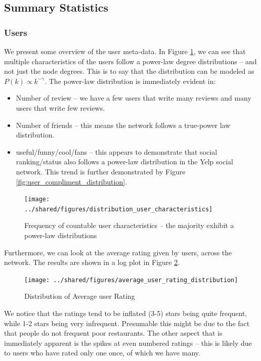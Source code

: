 \documentclass[letterpaper, 10 pt, conference]{ieeeconf}  %
\begin{document}
\subsection{Summary Statistics}
\subsubsection{Users}
We present some overview of the user meta-data. In Figure \ref{fig:user_characteristics}, we can see that multiple characteristics of the users follow a power-law degree distributions -- and not just the node degrees. This is to say that the distribution can be modeled as $P(k) \propto k^{-\gamma}$. The power-law distribution is immediately evident in:

\begin{itemize}
\item Number of review -- we have a few users that write many reviews and many users that write few reviews.
\item Number of friends -- this means the network follows a true-power law distribution.
\item useful/funny/cool/fans -- this appears to demonstrate that social ranking/status also follows a power-law distribution in the Yelp social network. This trend is further demonstrated by Figure \ref{fig:user_compliment_distribution}.
\end{itemize} 

\begin{figure}[h!]
\centering
\texttt{[image: ../shared/figures/distribution\_user\_characteristics]}
\caption{Frequency of countable user characteristics -- the majority exhibit a power-law distributions}
\label{fig:user_characteristics}
\end{figure}

Furthermore, we can look at the average rating given by users, across the network. The results are shown in a log plot in Figure \ref{fig:user_rating_distribution}.

\begin{figure}[h!]
\centering
\texttt{[image: ../shared/figures/average\_user\_rating\_distribution]}
\caption{Distribution of Average user Rating}
\label{fig:user_rating_distribution}
\end{figure}

We notice that the ratings tend to be inflated (3-5) stars being quite frequent, while 1-2 stars being very infrequent. Presumable this might be due to the fact that people do not frequent poor restaurants. The other aspect that is immediately apparent is the spikes at even numbered ratings -- this is likely due to users who have rated only one once, of which we have many.
\end{document}
